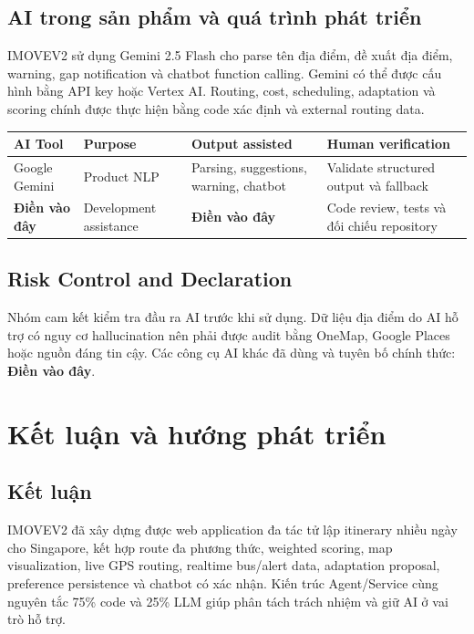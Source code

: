 \documentclass[12pt,a4paper]{article}
\newcommand{\dienvao}{\textbf{Điền vào đây}}
\begin{document}
\subsection{AI trong sản phẩm và quá trình phát triển}


IMOVEV2 sử dụng Gemini 2.5 Flash cho parse tên địa điểm, đề xuất địa điểm, warning, gap notification và chatbot function calling. Gemini có thể được cấu hình bằng API key hoặc Vertex AI. Routing, cost, scheduling, adaptation và scoring chính được thực hiện bằng code xác định và external routing data.

\begin{longtable}{|L{3.0cm}|L{3.5cm}|L{4.5cm}|L{4.0cm}|}
\hline
\textbf{AI Tool} & \textbf{Purpose} & \textbf{Output assisted} & \textbf{Human verification} \\ \hline
\endhead
Google Gemini & Product NLP & Parsing, suggestions, warning, chatbot & Validate structured output và fallback \\ \hline
\dienvao & Development assistance & \dienvao & Code review, tests và đối chiếu repository \\ \hline
\end{longtable}

\subsection{Risk Control and Declaration}


Nhóm cam kết kiểm tra đầu ra AI trước khi sử dụng. Dữ liệu địa điểm do AI hỗ trợ có nguy cơ hallucination nên phải được audit bằng OneMap, Google Places hoặc nguồn đáng tin cậy. Các công cụ AI khác đã dùng và tuyên bố chính thức: \dienvao.

\section{Kết luận và hướng phát triển}

\subsection{Kết luận}


IMOVEV2 đã xây dựng được web application đa tác tử lập itinerary nhiều ngày cho Singapore, kết hợp route đa phương thức, weighted scoring, map visualization, live GPS routing, realtime bus/alert data, adaptation proposal, preference persistence và chatbot có xác nhận. Kiến trúc Agent/Service cùng nguyên tắc 75\% code và 25\% LLM giúp phân tách trách nhiệm và giữ AI ở vai trò hỗ trợ.
\end{document}
